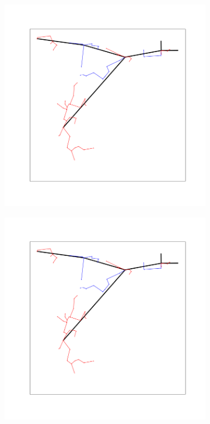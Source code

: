 \documentclass[11pt,letterpaper]{article}
\begin{document}
\begin{figure}[h]
	\centering
	\begin{subfigure}[h]{0.32\textwidth}
		\centering
		\includegraphics[width=\textwidth]{met-1-link1}
		\caption{}
		\label{sfig:link1}
	\end{subfigure}
	\begin{subfigure}[h]{0.32\textwidth}
		\centering
		\includegraphics[width=\textwidth]{met-1-link1}

\end{subfigure}
\end{figure}
\end{document}

